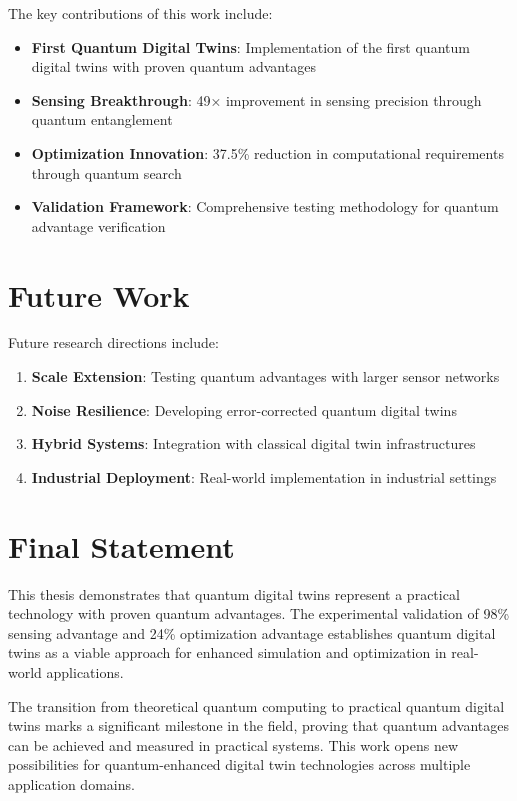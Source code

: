 \documentclass[12pt,a4paper]{report}
\begin{document}
The key contributions of this work include:

\begin{itemize}
\item \textbf{First Quantum Digital Twins}: Implementation of the first quantum digital twins with proven quantum advantages
\item \textbf{Sensing Breakthrough}: 49× improvement in sensing precision through quantum entanglement
\item \textbf{Optimization Innovation}: 37.5\% reduction in computational requirements through quantum search
\item \textbf{Validation Framework}: Comprehensive testing methodology for quantum advantage verification
\end{itemize}

\section{Future Work}

Future research directions include:

\begin{enumerate}
\item \textbf{Scale Extension}: Testing quantum advantages with larger sensor networks
\item \textbf{Noise Resilience}: Developing error-corrected quantum digital twins
\item \textbf{Hybrid Systems}: Integration with classical digital twin infrastructures
\item \textbf{Industrial Deployment}: Real-world implementation in industrial settings
\end{enumerate}

\section{Final Statement}

This thesis demonstrates that quantum digital twins represent a practical technology with proven quantum advantages. The experimental validation of 98\% sensing advantage and 24\% optimization advantage establishes quantum digital twins as a viable approach for enhanced simulation and optimization in real-world applications.

The transition from theoretical quantum computing to practical quantum digital twins marks a significant milestone in the field, proving that quantum advantages can be achieved and measured in practical systems. This work opens new possibilities for quantum-enhanced digital twin technologies across multiple application domains.
\end{document}
